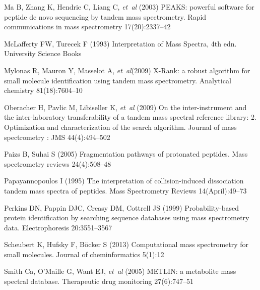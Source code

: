 \begin{thebibliography}{38}
Ma B, Zhang K, Hendrie C, Liang C, \emph{et~al} (2003)
  {PEAKS: powerful software for peptide de novo sequencing by tandem mass
  spectrometry.} Rapid communications in mass spectrometry 17(20):2337--42

McLafferty FW, Turecek F (1993) {Interpretation of Mass Spectra}, 4th edn.
  University Science Books

Mylonas R, Mauron Y, Masselot A, \emph{et~al}(2009) {X-Rank: a robust algorithm for small
  molecule identification using tandem mass spectrometry.} Analytical chemistry
  81(18):7604--10

Oberacher H, Pavlic M, Libiseller K, \emph{et~al} (2009) {On the inter-instrument and the
  inter-laboratory transferability of a tandem mass spectral reference library:
  2. Optimization and characterization of the search algorithm.} Journal of
  mass spectrometry : JMS 44(4):494--502

Paizs B, Suhai S (2005) {Fragmentation pathways of protonated peptides.} Mass
  spectrometry reviews 24(4):508--48

Papayannopoulos I (1995) {The interpretation of collision-induced
  dissociation tandem mass spectra of peptides}. Mass Spectrometry Reviews
  14(April):49--73

Perkins DN, Pappin DJC, Creasy DM, Cottrell JS (1999) {Probability-based
  protein identification by searching sequence databases using mass
  spectrometry data}. Electrophoresis 20:3551--3567

Scheubert K, Hufsky F, B\"{o}cker S (2013) {Computational mass spectrometry for
  small molecules.} Journal of cheminformatics 5(1):12

Smith Ca, O'Maille G, Want EJ, \emph{et~al} (2005) {METLIN: a metabolite mass spectral database.}
  Therapeutic drug monitoring 27(6):747--51


\end{thebibliography}
